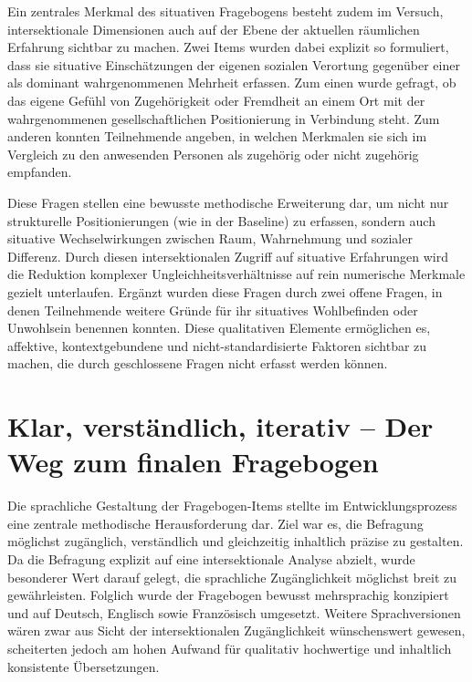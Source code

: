 Ein zentrales Merkmal des situativen Fragebogens besteht zudem im Versuch, intersektionale Dimensionen auch auf der Ebene der aktuellen räumlichen Erfahrung sichtbar zu machen. Zwei Items wurden dabei explizit so formuliert, dass sie situative Einschätzungen der eigenen sozialen Verortung gegenüber einer als dominant wahrgenommenen Mehrheit erfassen. Zum einen wurde gefragt, ob das eigene Gefühl von Zugehörigkeit oder Fremdheit an einem Ort mit der wahrgenommenen gesellschaftlichen Positionierung in Verbindung steht. Zum anderen konnten Teilnehmende angeben, in welchen Merkmalen sie sich im Vergleich zu den anwesenden Personen als zugehörig oder nicht zugehörig empfanden.

Diese Fragen stellen eine bewusste methodische Erweiterung dar, um nicht nur strukturelle Positionierungen (wie in der Baseline) zu erfassen, sondern auch situative Wechselwirkungen zwischen Raum, Wahrnehmung und sozialer Differenz. Durch diesen intersektionalen Zugriff auf situative Erfahrungen wird die Reduktion komplexer Ungleichheitsverhältnisse auf rein numerische Merkmale gezielt unterlaufen. Ergänzt wurden diese Fragen durch zwei offene Fragen, in denen Teilnehmende weitere Gründe für ihr situatives Wohlbefinden oder Unwohlsein benennen konnten. Diese qualitativen Elemente ermöglichen es, affektive, kontextgebundene und nicht-standardisierte Faktoren sichtbar zu machen, die durch geschlossene Fragen nicht erfasst werden können.

\section{Klar, verständlich, iterativ -- Der Weg zum finalen Fragebogen}

Die sprachliche Gestaltung der Fragebogen-Items stellte im Entwicklungsprozess eine zentrale methodische Herausforderung dar. Ziel war es, die Befragung möglichst zugänglich, verständlich und gleichzeitig inhaltlich präzise zu gestalten. Da die Befragung explizit auf eine intersektionale Analyse abzielt, wurde besonderer Wert darauf gelegt, die sprachliche Zugänglichkeit möglichst breit zu gewährleisten. Folglich wurde der Fragebogen bewusst mehrsprachig konzipiert und auf Deutsch, Englisch sowie Französisch umgesetzt. Weitere Sprachversionen wären zwar aus Sicht der intersektionalen Zugänglichkeit wünschenswert gewesen, scheiterten jedoch am hohen Aufwand für qualitativ hochwertige und inhaltlich konsistente Übersetzungen.

